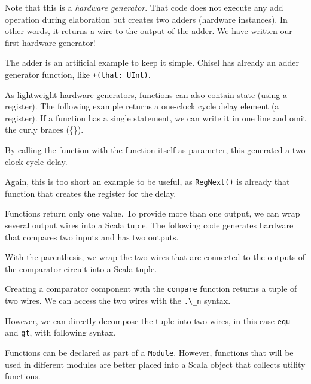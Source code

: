 \documentclass[%
    10pt,
    headinclude, footexclude,
    openright, %
    notitlepage,
    cleardoubleempty,
    headsepline,
    pointlessnumbers,
    bibtotoc, idxtotoc,
    ]{scrbook}
\newcommand{\code}[1]{{\lstinline[basicstyle=\small\ttfamily]{#1}}}
\begin{document}

\noindent Note that this is a \emph{hardware generator}. That code does not execute any add operation
during elaboration but creates two adders (hardware instances). In other words, it returns
a wire to the output of the adder.
We have written our first hardware generator!

The adder is an artificial example
to keep it simple. Chisel has already an adder generator function, like \code{+(that: UInt)}.

As lightweight hardware generators, functions can also contain state (using a register).
The following example returns a one-clock cycle delay element (a register).
If a function has a single statement, we can write it in one line and omit the curly
braces (\{\}).


\noindent By calling the function with the function itself as parameter, this generated a two
clock cycle delay.


\noindent Again, this is too short an example to be useful, as \code{RegNext()}
is already that function that creates the register for the delay.



Functions return only one value. To provide more than one output, we
can wrap several output wires into a Scala tuple. The following code generates hardware that
compares two inputs and has two outputs.


\noindent With the parenthesis, we wrap the two wires that are connected to the outputs of
the comparator circuit into a Scala tuple.

Creating a comparator component
with the \code{compare} function returns a tuple of two wires. We can access the two
wires with the \code{.\_n} syntax.


\noindent However, we can directly decompose the tuple into two wires, in this case \code{equ}
and \code{gt}, with following syntax.



Functions can be declared as part of a \code{Module}. However, functions that will be
used in different modules are better placed into a Scala object that collects utility
functions.
\end{document}
